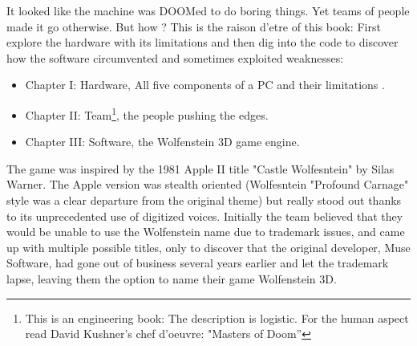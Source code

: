 It looked like the machine was DOOMed to do boring things. Yet teams of people made it go otherwise. But how ? This is the raison d'etre of this book: First explore the hardware with its limitations and then dig into the code to discover how the software circumvented and sometimes exploited weaknesses:
\begin{itemize}
\item Chapter I: Hardware, All five components of a PC and their limitations	.
\item Chapter II: Team\footnote{This is an engineering book: The description is logistic. For the human aspect read David Kushner's chef d'oeuvre: "Masters of Doom''}, the people pushing the edges.
\item Chapter III: Software, the Wolfenstein 3D game engine.
\end{itemize}
\par
{} The game was inspired by the 1981 Apple II title "Castle Wolfesntein" by Silas Warner. The Apple version was stealth oriented (Wolfesntein "Profound Carnage" style was a clear departure from the original theme) but really stood out thanks to its unprecedented use of digitized voices. Initially the team believed that they would be unable to use the Wolfenstein name due to trademark issues, and came up with multiple possible titles, only to discover that the original developer, Muse Software, had gone out of business several years earlier and let the trademark lapse, leaving them the option to name their game Wolfenstein 3D.

\begin{figure}[H]
\centering
{}
\end{figure}
